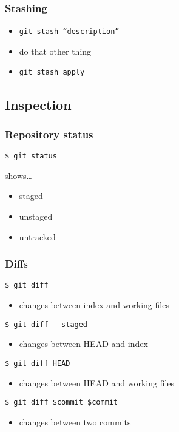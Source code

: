 \documentclass[english]{beamer}
\newcommand{\mysubsection}[2]{%
  \hypertarget{#2}{}%
  \subsection{#1}%
  \label{#2}%
}
\newcommand{\CMD}[1]{%
\texttt{\textcolor{code-green}{#1}}%
}
\begin{document}
\begin{frame}
\frametitle{Stashing}
\begin{itemize}
        \item \CMD{git stash ``description''}
                \pause{}
                \vspace{\baselineskip}
        \item do that other thing
                \pause{}
                \vspace{\baselineskip}
        \item \CMD{git stash apply}
\end{itemize}
\end{frame}


\mysubsection{Inspection}{using:inspection}
\begin{frame}
\frametitle{Repository status}

\CMD{\$ git status}

\vspace{.1\textheight}
shows\ldots
\begin{itemize}
        \item staged
        \item unstaged
        \item untracked
\end{itemize}
\end{frame}

\begin{frame}
\frametitle{Diffs}

\CMD{\$ git diff}
\begin{itemize}
        \item changes between index and working files
\end{itemize}

\pause{}
\vspace{.1\textheight}

\CMD{\$ git diff {-}-staged}
\begin{itemize}
        \item changes between HEAD and index
\end{itemize}

\pause{}
\vspace{.1\textheight}

\CMD{\$ git diff HEAD}
\begin{itemize}
        \item changes between HEAD and working files
\end{itemize}

\pause{}
\vspace{.1\textheight}

\CMD{\$ git diff \$commit \$commit}
\begin{itemize}
        \item changes between two commits
\end{itemize}

\end{frame}
\end{document}
